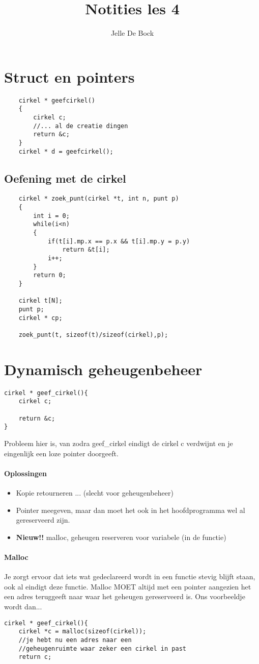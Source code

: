 \documentclass{article}
\title{Notities les 4}
\author{Jelle De Bock}
\begin{document}
\maketitle
\section{Struct en pointers}
\begin{lstlisting}
    cirkel * geefcirkel()
    {
        cirkel c;
        //... al de creatie dingen
        return &c;
    }
    cirkel * d = geefcirkel();
\end{lstlisting}
\subsection{Oefening met de cirkel}
\begin{lstlisting}
    cirkel * zoek_punt(cirkel *t, int n, punt p)
    {
        int i = 0;
        while(i<n)
        {
            if(t[i].mp.x == p.x && t[i].mp.y = p.y)
                return &t[i];           
            i++;
        }
        return 0;
    }

    cirkel t[N];
    punt p;
    cirkel * cp;

    zoek_punt(t, sizeof(t)/sizeof(cirkel),p);

\end{lstlisting}
\section{Dynamisch geheugenbeheer}
\begin{lstlisting}
cirkel * geef_cirkel(){
    cirkel c;
    
    return &c;
}
\end{lstlisting}
Probleem hier is, van zodra geef\_cirkel eindigt de cirkel c verdwijnt en je eingenlijk een loze pointer doorgeeft.
\paragraph{Oplossingen} 
\begin{itemize}
    \item Kopie retourneren ... (slecht voor geheugenbeheer)
    \item Pointer meegeven, maar dan moet het ook in het hoofdprogramma wel al gereserveerd zijn.
    \item \textbf{Nieuw!!} malloc, geheugen reserveren voor variabele (in de functie)
\end{itemize}
\paragraph{Malloc} 
Je zorgt ervoor dat iets wat gedeclareerd wordt in een functie stevig blijft staan, ook al eindigt deze functie. 
Malloc MOET altijd met een pointer aangezien het een adres teruggeeft naar waar het geheugen gereserveerd is.
Ons voorbeeldje wordt dan...
\begin{lstlisting}
cirkel * geef_cirkel(){
    cirkel *c = malloc(sizeof(cirkel));
    //je hebt nu een adres naar een 
    //geheugenruimte waar zeker een cirkel in past
    return c;

\end{lstlisting}
\end{document}
